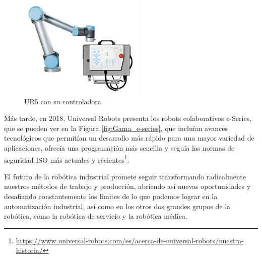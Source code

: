   \begin{figure} [H]
    \begin{center}
      \includegraphics[width=60mm]{figs/UR5_controller.png}
    \end{center}
    \caption{UR5 con su controladora}
    \label{fig:UR5}
  \end{figure} 
Más tarde, en 2018, Universal Robots presenta los robots colaborativos e-Series, que se pueden ver en la Figura \ref{fig:Gama_e-series}, que incluían avances tecnológicos que permitían un desarrollo más rápido para una mayor variedad de aplicaciones, ofrecía una programación más sencilla y seguía las normas de seguridad ISO más actuales y recientes\footnote{\url{https://www.universal-robots.com/es/acerca-de-universal-robots/nuestra-historia/}}.
 

El futuro de la robótica industrial promete seguir transformando radicalmente nuestros métodos de trabajo y producción, abriendo así nuevas oportunidades y desafiando constantemente los límites de lo que podemos lograr en la automatización industrial, así como en los otros dos grandes grupos de la robótica, como la robótica de servicio y la robótica médica.
   
